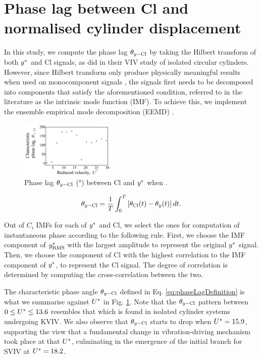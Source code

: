 \documentclass[oneside]{utmthesis}
\begin{document}
\section{Phase lag between Cl and normalised cylinder displacement} \label{sec:phaseLag90}

In this study, we compute the phase lag $\theta_{y-\text{Cl}}$ by taking the Hilbert transform of both $y^{*}$ and Cl signals, as \citet{Khalak1999} did in their VIV study of isolated circular cylinders. However, since Hilbert transform only produce physically meaningful results when used on monocomponent signals \citep{Huang1998,Huang2005,Huang2014}, the signals first needs to be decomposed into components that satisfy the aforementioned condition, referred to in the literature as the intrinsic mode function (IMF). To achieve this, we implement the ensemble empirical mode decomposition (EEMD) \citep{Wu2008}.

\begin{figure}
  \centering
  \includegraphics[width=0.4\textwidth]{figs/phaseLag5}
  \caption{Phase lag $\theta_{y-\text{Cl}}$ (\si{\degree}) between Cl and $y^{*}$ when \angfi{}.}
  \label{fig:phaseLag90deg}
\end{figure}

\begin{equation}
  \theta_{y-\text{Cl}} = \frac{1}{T} \int_{0}^{T} \left[ \theta_{\text{Cl}}(t) - \theta_{y}(t) \right] dt.
  \label{eq:phaseLagDefinition}
\end{equation}

Out of $C_{i}$ IMFs for each of $y^{*}$ and Cl, we select the ones for computation of instantaneous phase according to the following rule. First, we choose the IMF component of $y^{*}_{\text{RMS}}$ with the largest \rms{} amplitude to represent the original $y^{*}$ signal. Then, we choose the component of Cl with the highest correlation to the IMF component of $y^{*}$, to represent the Cl signal. The degree of correlation is determined by computing the cross-correlation between the two.

The characteristic phase angle $\theta_{y-\text{Cl}}$ defined in Eq. \ref{eq:phaseLagDefinition} is what we summarise against $U^{*}$ in Fig. \ref{fig:phaseLag90deg}. Note that the $\theta_{y-\text{Cl}}$ pattern between $0 \leq U^{*} \leq 13.6$ resembles that which is found in isolated cylinder systems undergoing KVIV. We also observe that $\theta_{y-\text{Cl}}$ starts to drop when $U^{*} = 15.9$, supporting the view that a fundamental change in vibration-driving mechanism took place at that $U^{*}$, culminating in the emergence of the initial branch for SVIV at $U^{*} = 18.2$.
\end{document}
